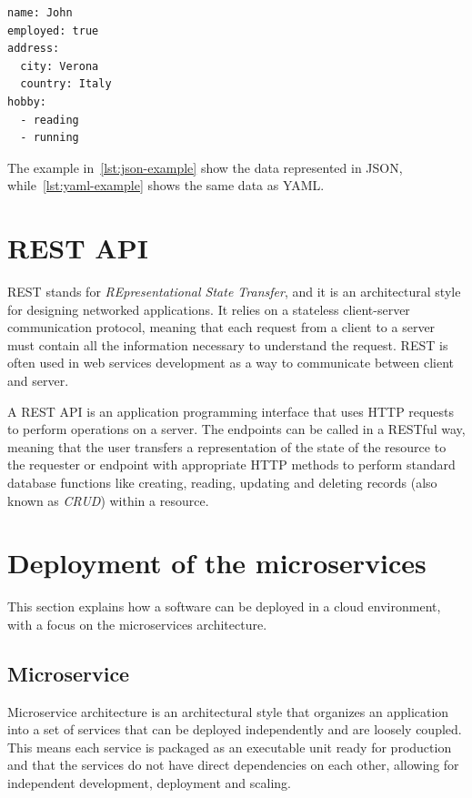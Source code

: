 \noindent\begin{minipage}{\linewidth}
  \vspace{0.5cm}
  \begin{lstlisting}[style=yaml, caption={YAML example}, label={lst:yaml-example}]
name: John
employed: true
address:
  city: Verona
  country: Italy
hobby:
  - reading
  - running
  \end{lstlisting}
\end{minipage}

The example in~\cref{lst:json-example} show the data represented in JSON, while~\cref{lst:yaml-example} shows the same data as YAML.

\section{REST API}

REST stands for \textit{REpresentational State Transfer}, and it is an architectural style for designing networked applications. It relies on a stateless client-server communication protocol, meaning that each request from a client to a server must contain all the information necessary to understand the request. REST is often used in web services development as a way to communicate between client and server.

A REST API is an application programming interface that uses HTTP requests to perform operations on a server. The endpoints can be called in a RESTful way, meaning that the user transfers a representation of the state of the resource to the requester or endpoint with appropriate HTTP methods to perform standard database functions like creating, reading, updating and deleting records (also known as \textit{CRUD}) within a resource.~\cite{rest-api}

\section{Deployment of the microservices}

This section explains how a software can be deployed in a cloud environment, with a focus on the microservices architecture.

\subsection{Microservice}

Microservice architecture is an architectural style that organizes an application into a set of services that can be deployed independently and are loosely coupled. This means each service is packaged as an executable unit ready for production and that the services do not have direct dependencies on each other, allowing for independent development, deployment and scaling.~\cite{microservices-what-are}

